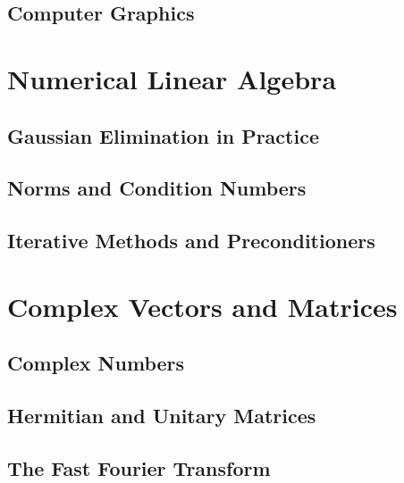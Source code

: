 \documentclass{book}
\begin{document}
\section{Computer Graphics}










\chapter{Numerical Linear Algebra}
\section{Gaussian Elimination in Practice}

\section{Norms and Condition Numbers}

\section{Iterative Methods and Preconditioners}










\chapter{Complex Vectors and Matrices}
\section{Complex Numbers}

\section{Hermitian and Unitary Matrices}

\section{The Fast Fourier Transform}
\end{document}
